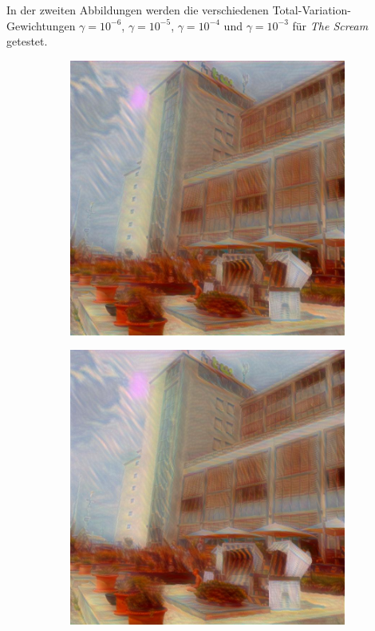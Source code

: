 In der zweiten Abbildungen werden die verschiedenen Total-Variation-Gewichtungen $ \gamma = 10^{-6} $, $ \gamma = 10^{-5} $, $ \gamma = 10^{-4} $ und $ \gamma = 10^{-3} $ für \textit{The Scream} getestet.

\begin{figure}[H]
    \centering
    \begin{subfigure}[h]{0.24\textwidth}
        \centering
        \includegraphics[width=\textwidth]{resources/content/experiments/b__the_scream__768x768__style-weight_1e+07__tv-weight_1e-06.jpg}
    \end{subfigure}
    \begin{subfigure}[h]{0.24\textwidth}
        \centering
        \includegraphics[width=\textwidth]{resources/content/experiments/b__the_scream__768x768__style-weight_1e+07__tv-weight_1e-05.jpg}

\end{subfigure}
\end{figure}
